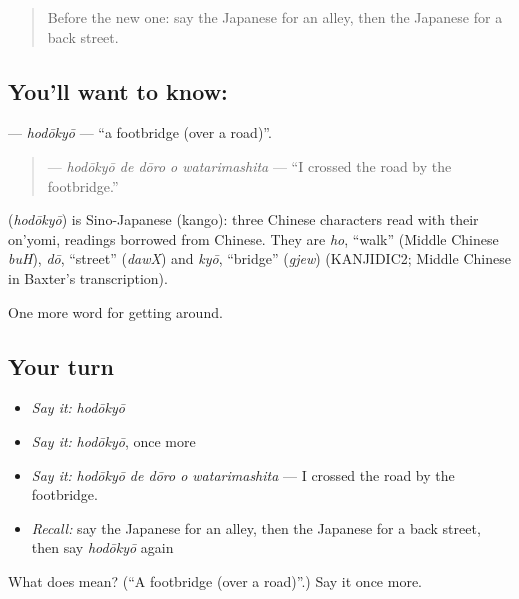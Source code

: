 \begin{quote}
Before the new one: say the Japanese for an alley, then the Japanese for a back street.
\end{quote}

\subsection*{You'll want to know: }
\textbf{} — \emph{hodōkyō} — \textquotedblleft{}a footbridge (over a road)\textquotedblright{}.

\begin{quote}
\textbf{  } — \emph{hodōkyō de dōro o watarimashita} — \textquotedblleft{}I crossed the road by the footbridge.\textquotedblright{}
\end{quote}

\begin{cousinweb}
\textbf{} (\emph{hodōkyō}) is Sino-Japanese (kango): three Chinese characters read with their on'yomi, readings borrowed from Chinese. They are \emph{ho}, \textquotedblleft{}walk\textquotedblright{} (Middle Chinese \emph{buH}), \emph{dō}, \textquotedblleft{}street\textquotedblright{} (\emph{dawX}) and \emph{kyō}, \textquotedblleft{}bridge\textquotedblright{} (\emph{gjew}) (KANJIDIC2; Middle Chinese in Baxter's transcription).
\end{cousinweb}

\begin{grammarlens}[title={What you've built}]
One more word for getting around.
\end{grammarlens}

\subsection*{Your turn}
\begin{itemize}
\raggedright
  \item \emph{Say it:} \emph{hodōkyō}
  \item \emph{Say it:} \emph{hodōkyō}, once more
  \item \emph{Say it:} \emph{hodōkyō de dōro o watarimashita} — I crossed the road by the footbridge.
  \item \emph{Recall:} say the Japanese for an alley, then the Japanese for a back street, then say \emph{hodōkyō} again
\end{itemize}

\begin{tcolorbox}[breakable,colback=teal!4,colframe=teal!35!black,title={Before you move on}]
What does  mean? (\textquotedblleft{}A footbridge (over a road)\textquotedblright{}.) Say it once more.
\end{tcolorbox}
